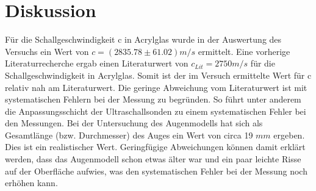 \section{Diskussion}
\label{sec:Diskussion}
Für die Schallgeschwindigkeit c in Acrylglas wurde in der Auswertung des Versuchs ein Wert von $c=(2835.78 \pm 61.02) m/s$ ermittelt. Eine vorherige Literaturrecherche ergab einen Literaturwert von $c_{Lit}=2750 m/s$ für die Schallgeschwindigkeit in Acrylglas. Somit ist der im Versuch ermittelte Wert für c relativ nah am Literaturwert. Die geringe Abweichung vom Literaturwert ist mit systematischen Fehlern bei der Messung zu begründen. So führt unter anderem die Anpassungsschicht der Ultraschallsonden zu einem systematischen Fehler bei den Messungen. \newline
Bei der Untersuchung des Augenmodells hat sich als Gesamtlänge (bzw. Durchmesser) des Auges ein Wert von circa 19 $mm$ ergeben. Dies ist ein realistischer Wert. Geringfügige Abweichungen können damit erklärt werden, dass das Augenmodell schon etwas älter war und ein paar leichte Risse auf der Oberfläche aufwies, was den systematischen Fehler bei der Messung noch erhöhen kann.    
